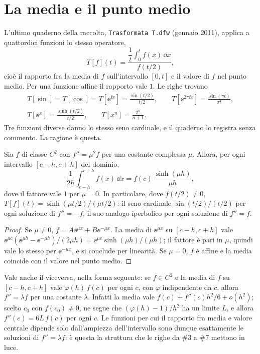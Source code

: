 \section{La media e il punto medio}
\label{sec:media}

L'ultimo quaderno della raccolta, \texttt{Trasformata T.dfw} (gennaio 2011),
applica a quattordici funzioni lo stesso operatore,
\[
  T[f](t)=\frac{\dfrac1t\displaystyle\int_0^t f(x)\,\dd x}{f(t/2)},
\]
cio\`e il rapporto fra la media di $f$ sull'intervallo $[0,t]$ e il valore
di $f$ nel punto medio. Per una funzione affine il rapporto vale $1$. Le
righe  trovano
\begin{gather*}
  T[\sin]=T[\cos]=T[\ee^{\ii x}]=\frac{\sin(t/2)}{t/2},\qquad
  T[\ee^{2\pi\ii x}]=\frac{\sin(\pi t)}{\pi t},\\
  T[\ee^{x}]=\frac{\sinh(t/2)}{t/2},\qquad
  T[x^n]=\frac{2^n}{n+1}.
\end{gather*}
Tre funzioni diverse danno lo stesso seno cardinale, e il quaderno lo
registra senza commento. La ragione \`e questa.

\begin{prop}\label{prop:media}
Sia $f$ di classe $C^2$ con $f''=\mu^2 f$ per una costante complessa $\mu$.
Allora, per ogni intervallo $[c-h,c+h]$ del dominio,
\[
  \frac1{2h}\int_{c-h}^{c+h}f(x)\,\dd x=f(c)\,\frac{\sinh(\mu h)}{\mu h},
\]
dove il fattore vale $1$ per $\mu=0$. In particolare, dove $f(t/2)\neq0$,
$T[f](t)=\sinh(\mu t/2)/(\mu t/2)$: il seno cardinale $\sin(t/2)/(t/2)$ per
ogni soluzione di $f''=-f$, il suo analogo iperbolico per ogni soluzione di
$f''=f$.
\end{prop}

\begin{proof}
Se $\mu\neq0$, $f=A\ee^{\mu x}+B\ee^{-\mu x}$. La media di $\ee^{\mu x}$ su
$[c-h,c+h]$ vale $\ee^{\mu c}(\ee^{\mu h}-\ee^{-\mu h})/(2\mu h)
=\ee^{\mu c}\sinh(\mu h)/(\mu h)$; il fattore \`e pari in $\mu$, quindi vale
lo stesso per $\ee^{-\mu x}$, e si conclude per linearit\`a. Se $\mu=0$, $f$
\`e affine e la media coincide con il valore nel punto medio.
\end{proof}

\begin{oss}
Vale anche il viceversa, nella forma seguente: se $f\in C^2$ e la media di
$f$ su $[c-h,c+h]$ vale $\varphi(h)\,f(c)$ per ogni $c$, con $\varphi$
indipendente da $c$, allora $f''=\lambda f$ per una costante $\lambda$.
Infatti la media vale $f(c)+f''(c)h^2/6+o(h^2)$; scelto $c_0$ con
$f(c_0)\neq0$, ne segue che $(\varphi(h)-1)/h^2$ ha un limite $L$, e allora
$f''(c)=6L\,f(c)$ per ogni $c$. Le funzioni per cui il rapporto fra media e
valore centrale dipende solo dall'ampiezza dell'intervallo sono dunque
esattamente le soluzioni di $f''=\lambda f$: \`e questa la struttura che le
righe da \#3 a \#7 mettono in luce.
\end{oss}

